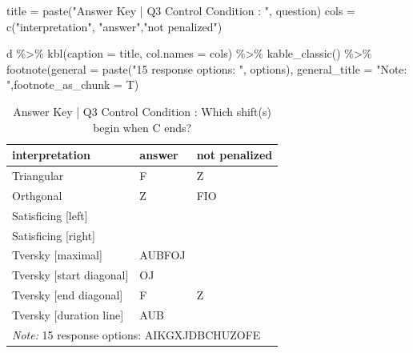 \documentclass[
  letterpaper,
  DIV=11,
  numbers=noendperiod]{scrreprt}
\newenvironment{Shaded}{\begin{snugshade}}{\end{snugshade}}
\newcommand{\AttributeTok}[1]{\textcolor[rgb]{0.40,0.45,0.13}{#1}}
\newcommand{\FunctionTok}[1]{\textcolor[rgb]{0.28,0.35,0.67}{#1}}
\newcommand{\NormalTok}[1]{\textcolor[rgb]{0.00,0.23,0.31}{#1}}
\newcommand{\OtherTok}[1]{\textcolor[rgb]{0.00,0.23,0.31}{#1}}
\newcommand{\SpecialCharTok}[1]{\textcolor[rgb]{0.37,0.37,0.37}{#1}}
\newcommand{\StringTok}[1]{\textcolor[rgb]{0.13,0.47,0.30}{#1}}
\begin{document}
\begin{Shaded}
\begin{Highlighting}[]
\NormalTok{title }\OtherTok{=} \FunctionTok{paste}\NormalTok{(}\StringTok{"Answer Key | Q3 Control Condition : "}\NormalTok{, question)}
\NormalTok{cols }\OtherTok{=} \FunctionTok{c}\NormalTok{(}\StringTok{"interpretation"}\NormalTok{, }\StringTok{"answer"}\NormalTok{,}\StringTok{"not penalized"}\NormalTok{)}

\NormalTok{d }\SpecialCharTok{\%\textgreater{}\%} \FunctionTok{kbl}\NormalTok{(}\AttributeTok{caption =}\NormalTok{ title, }\AttributeTok{col.names =}\NormalTok{ cols) }\SpecialCharTok{\%\textgreater{}\%} \FunctionTok{kable\_classic}\NormalTok{() }\SpecialCharTok{\%\textgreater{}\%} 
  \FunctionTok{footnote}\NormalTok{(}\AttributeTok{general =} \FunctionTok{paste}\NormalTok{(}\StringTok{"15 response options: "}\NormalTok{, options), }\AttributeTok{general\_title =} \StringTok{"Note: "}\NormalTok{,}\AttributeTok{footnote\_as\_chunk =}\NormalTok{ T) }
\end{Highlighting}
\end{Shaded}

\begin{table}

\caption{Answer Key | Q3 Control Condition :  Which shift(s) begin when C ends?}
\centering
\begin{tabular}[t]{l|l|l}
\hline
interpretation & answer & not penalized\\
\hline
Triangular & F & Z\\
\hline
Orthgonal & Z & FIO\\
\hline
Satisficing [left] &  & \\
\hline
Satisficing [right] &  & \\
\hline
Tversky [maximal] & AUBFOJ & \\
\hline
Tversky [start diagonal] & OJ & \\
\hline
Tversky [end diagonal] & F & Z\\
\hline
Tversky [duration line] & AUB & \\
\hline
\multicolumn{3}{l}{\rule{0pt}{1em}\textit{Note: } 15 response options:  AIKGXJDBCHUZOFE}\\
\end{tabular}
\end{table}
\end{document}
